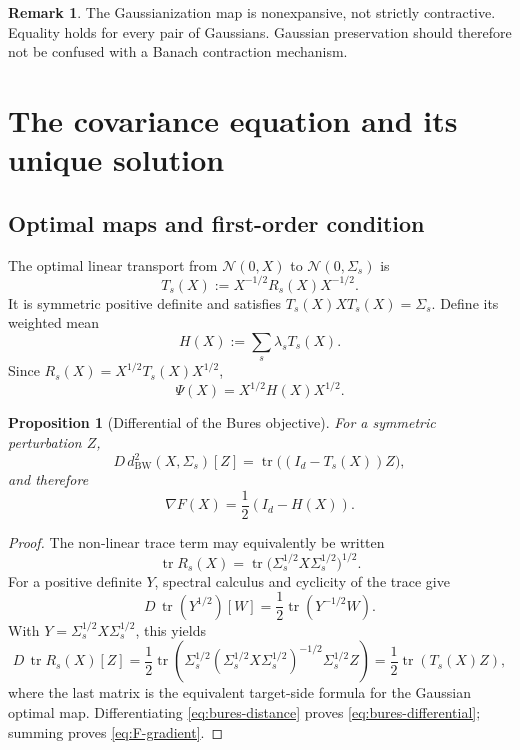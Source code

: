 \documentclass[11pt]{article}
\newtheorem{proposition}[theorem]{Proposition}
\theoremstyle{definition}
\newtheorem{remark}[theorem]{Remark}
\newcommand{\Id}{I_d}
\newcommand{\tr}{\operatorname{tr}}
\newcommand{\cN}{\mathcal N}
\begin{document}
\begin{remark}
The Gaussianization map is nonexpansive, not strictly contractive.  Equality
holds for every pair of Gaussians.  Gaussian preservation should therefore not
be confused with a Banach contraction mechanism.
\end{remark}

\section{The covariance equation and its unique solution}

\subsection{Optimal maps and first-order condition}

The optimal linear transport from $\cN(0,X)$ to $\cN(0,\Sigma_s)$ is
\begin{equation}\label{eq:optimal-map}
 T_s(X):=X^{-1/2}R_s(X)X^{-1/2}.
\end{equation}
It is symmetric positive definite and satisfies
$T_s(X)XT_s(X)=\Sigma_s$.  Define its weighted mean
\begin{equation}\label{eq:H-def}
 H(X):=\sum_s\lambda_sT_s(X).
\end{equation}
Since $R_s(X)=X^{1/2}T_s(X)X^{1/2}$,
\begin{equation}\label{eq:Psi-H}
 \Psi(X)=X^{1/2}H(X)X^{1/2}.
\end{equation}

\begin{proposition}[Differential of the Bures objective]
For a symmetric perturbation $Z$,
\begin{equation}\label{eq:bures-differential}
 D\,d_{\mathrm{BW}}^2(X,\Sigma_s)[Z]
 =\tr\bigl((\Id-T_s(X))Z\bigr),
\end{equation}
and therefore
\begin{equation}\label{eq:F-gradient}
 \nabla F(X)=\frac12(\Id-H(X)).
\end{equation}
\end{proposition}

\begin{proof}
The non-linear trace term may equivalently be written
\[
 \tr R_s(X)=
 \tr\bigl(\Sigma_s^{1/2}X\Sigma_s^{1/2}\bigr)^{1/2}.
\]
For a positive definite $Y$, spectral calculus and cyclicity of the trace give
\[
 D\,\tr(Y^{1/2})[W]=\frac12\tr(Y^{-1/2}W).
\]
With $Y=\Sigma_s^{1/2}X\Sigma_s^{1/2}$, this yields
\[
 D\,\tr R_s(X)[Z]
 =\frac12\tr\left(
 \Sigma_s^{1/2}(\Sigma_s^{1/2}X\Sigma_s^{1/2})^{-1/2}
 \Sigma_s^{1/2}Z\right)
 =\frac12\tr(T_s(X)Z),
\]
where the last matrix is the equivalent target-side formula for the Gaussian
optimal map.  Differentiating \eqref{eq:bures-distance} proves
\eqref{eq:bures-differential}; summing proves \eqref{eq:F-gradient}.
\end{proof}
\end{document}
